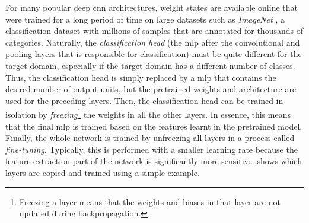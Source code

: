 \documentclass[../report.tex]{subfiles}
\begin{document}
For many popular deep \gls{cnn} architectures, weight states are available online that were trained for a long period of time on large datasets such as \emph{ImageNet} \cite{deng2009}, a classification dataset with millions of samples that are annotated for thousands of categories.
Naturally, the \emph{classification head} (the \gls{mlp} after the convolutional and pooling layers that is responsible for classification) must be quite different for the target domain, especially if the target domain has a different number of classes.
Thus, the classification head is simply replaced by a \gls{mlp} that contains the desired number of output units, but the pretrained weights and architecture are used for the preceding layers.
Then, the classification head can be trained in isolation by \emph{freezing}\footnote{Freezing a layer means that the weights and biases in that layer are not updated during backpropagation.} the weights in all the other layers.
In essence, this means that the final \gls{mlp} is trained based on the features learnt in the pretrained model.
Finally, the whole network is trained by unfreezing all layers in a process called \emph{fine-tuning}.
Typically, this is performed with a smaller learning rate because the feature extraction part of the network is significantly more sensitive.
 shows which layers are copied and trained using a simple example.
\end{document}
